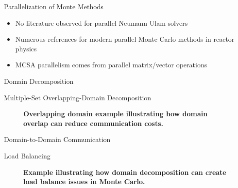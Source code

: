 \documentclass{beamer}
\begin{document}
\begin{frame}{Parallelization of Monte Methods}

  \begin{itemize}
  \item No literature observed for parallel Neumann-Ulam solvers
  \item Numerous references for modern parallel Monte Carlo methods
    in reactor physics
  \item MCSA parallelism comes from parallel matrix/vector operations
  \end{itemize}

\end{frame}

\begin{frame}{Domain Decomposition}

\end{frame}

\begin{frame}{Multiple-Set Overlapping-Domain Decomposition}

  \begin{figure}[htpb!]
    \begin{center}
      \scalebox{1.0}{
         }
    \end{center}
    \caption{\textbf{Overlapping domain example illustrating how domain
        overlap can reduce communication costs.}}
  \end{figure}

\end{frame}

\begin{frame}{Domain-to-Domain Communication}

\end{frame}

\begin{frame}{Load Balancing}

  \begin{figure}[htpb!]
    \begin{center}
      \scalebox{1.0}{
         }
    \end{center}
    \caption{\textbf{Example illustrating how domain decomposition can
        create load balance issues in Monte Carlo.}}
    \label{fig:procassini_example}
  \end{figure}

\end{frame}
\end{document}
